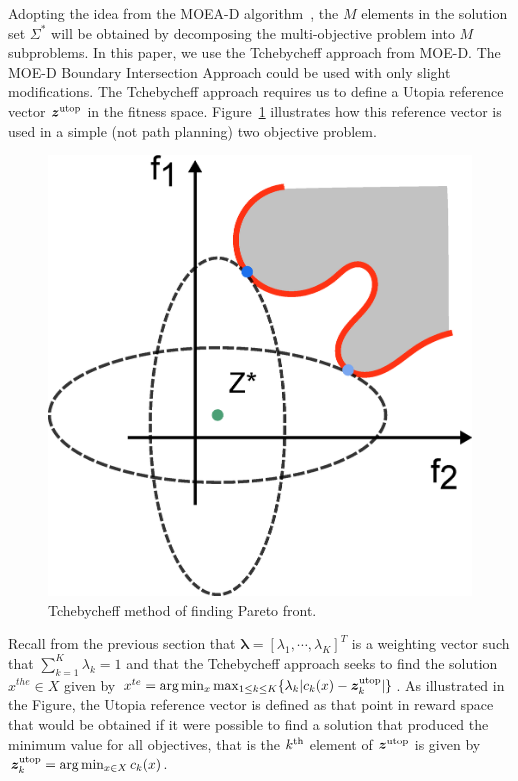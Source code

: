 \documentclass{article}
\begin{document}
Adopting the idea from the MOEA-D algorithm~\cite{4358754}, the $M$ elements in the solution set $\Sigma^{*}$ will be obtained by decomposing the multi-objective problem into $ M $ subproblems.  
In this paper, we use the Tchebycheff approach from MOE-D. The MOE-D Boundary Intersection Approach could be used with only slight modifications. The Tchebycheff approach requires us to define a Utopia reference vector $ \bm{z}^{\rm utop} $ in the fitness space. 
Figure~\ref{fig:Tchebycheff} illustrates how this reference vector is used in a simple (not path planning) two objective problem.  
\begin{figure}
\centering
\includegraphics[width=0.4\linewidth]{fig/Tchebycheff2.png}
\caption{Tchebycheff method of finding Pareto front.}
\label{fig:Tchebycheff}
\end{figure}
Recall from the previous section that  $ \bm{\lambda} = [ \lambda_{1} , \cdots , \lambda_{K}  ]^{T} $ is a weighting vector such that $ \sum_{k=1}^{K} \lambda_{k} = 1 $ and that the Tchebycheff approach seeks to find the solution $ x^{the}\in X $ given by $ x^{te} = \arg\min_x \max_{1 \leq k \leq K}  \{ \lambda_{k} | c_{k}(x) - \bm{z}^{\rm utop}_{k}  | \} $.  
As illustrated in the Figure, the Utopia reference vector is defined as that point in reward space that would be obtained if it were possible to find a solution that produced the minimum value for all objectives, that is the $k^{\rm th}$ element of $\bm{z}^{\rm utop}$ is given by $\bm{z}^{\rm utop}_{k} = \arg \min_{x \in X} c_{k}(x)$.  
\end{document}
